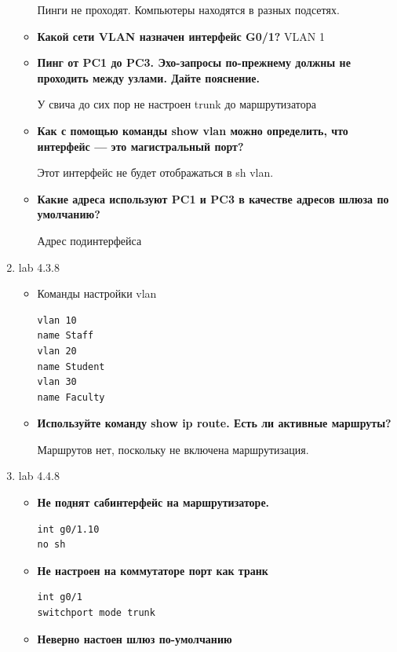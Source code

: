 \documentclass[a4paper,14pt]{extarticle}
\begin{document}
\begin{enumerate}
\begin{itemize}
                Пинги не проходят. Компьютеры находятся в разных подсетях.
            \item \textbf{Какой сети VLAN назначен интерфейс G0/1?}
                VLAN 1
            \item \textbf{Пинг от PC1 до PC3. Эхо-запросы по-прежнему должны не проходить между узлами. Дайте пояснение.}\par
                У свича до сих пор не настроен trunk до маршрутизатора
            \item \textbf{Как с помощью команды show vlan можно определить, что интерфейс — это магистральный порт?}\par
                Этот интерфейс не будет отображаться в sh vlan.
             \item \textbf{Какие адреса используют PC1 и PC3 в качестве адресов шлюза по умолчанию?}\par
                Адрес подинтерфейса
        \end{itemize}
        \item lab 4.3.8
        \begin{itemize}
            \item  Команды настройки vlan
            \begin{lstlisting}
vlan 10 
name Staff
vlan 20 
name Student
vlan 30 
name Faculty
            \end{lstlisting}
            \item \textbf{Используйте команду show ip route. Есть ли активные маршруты?}\par
                Маршрутов нет, поскольку не включена маршрутизация.
        \end{itemize}
        \item lab 4.4.8
        \begin{itemize}
            \item \textbf{Не поднят сабинтерфейс на маршрутизаторе.}\par
                \begin{lstlisting}
int g0/1.10
no sh
                \end{lstlisting}
            \item \textbf{Не настроен на коммутаторе порт как транк}\par
                \begin{lstlisting}
int g0/1
switchport mode trunk
                \end{lstlisting}
            \item \textbf{Неверно настоен шлюз по-умолчанию}\par

\end{itemize}
\end{enumerate}
\end{document}
